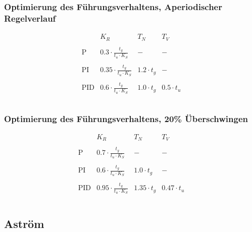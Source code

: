 \subsubsection{Optimierung des Führungsverhaltens, Aperiodischer Regelverlauf}
\[
    \begin{array}{lccc}
        &
            K_R &
            T_N &
            T_V \\\\
        \text{P} &
            0.3 \cdot \frac{t_g}{t_u \cdot K_S} &
            - &
            - \\\\
        \text{PI} &
            0.35 \cdot \frac{t_g}{t_u \cdot K_S} &
            1.2 \cdot t_g &
            - \\\\
        \text{PID} &
            0.6 \cdot \frac{t_g}{t_u \cdot K_S} &
            1.0 \cdot t_g &
            0.5 \cdot t_u \\\\
    \end{array}
\]

\subsubsection{Optimierung des Führungsverhaltens, 20\% Überschwingen}
\[
    \begin{array}{lccc}
        &
            K_R &
            T_N &
            T_V \\\\
        \text{P} &
            0.7 \cdot \frac{t_g}{t_u \cdot K_S} &
            - &
            - \\\\
        \text{PI} &
            0.6 \cdot \frac{t_g}{t_u \cdot K_S} &
            1.0 \cdot t_g &
            - \\\\
        \text{PID} &
            0.95 \cdot \frac{t_g}{t_u \cdot K_S} &
            1.35 \cdot t_g &
            0.47 \cdot t_u \\\\
    \end{array}
\]

\subsection{Aström}


